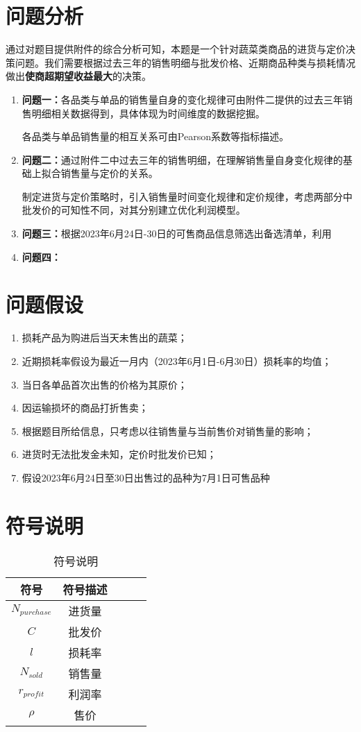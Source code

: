 \documentclass[withoutpreface,bwprint]{cumcmthesis} %
\begin{document}
\section{问题分析}
通过对题目提供附件的综合分析可知，本题是一个针对蔬菜类商品的进货与定价决策问题。我们需要根据过去三年的销售明细与批发价格、近期商品种类与损耗情况做出\textbf{使商超期望收益最大}的决策。

\begin{enumerate}
    \item \textbf{问题一：}各品类与单品的销售量自身的变化规律可由附件二提供的过去三年销售明细相关数据得到，具体体现为时间维度的数据挖掘。
    
    各品类与单品销售量的相互关系可由Pearson系数等指标描述。
    \item \textbf{问题二：}通过附件二中过去三年的销售明细，在理解销售量自身变化规律的基础上拟合销售量与定价的关系。
    
    制定进货与定价策略时，引入销售量时间变化规律和定价规律，考虑两部分中批发价的可知性不同，对其分别建立优化利润模型。
    \item \textbf{问题三：}根据2023年6月24日-30日的可售商品信息筛选出备选清单，利用
    \item \textbf{问题四：}
\end{enumerate}


\section{问题假设}
\begin{enumerate}
    \item 损耗产品为购进后当天未售出的蔬菜；
    \item 近期损耗率假设为最近一月内（2023年6月1日-6月30日）损耗率的均值；
    \item 当日各单品首次出售的价格为其原价；
    \item 因运输损坏的商品打折售卖；
    \item 根据题目所给信息，只考虑以往销售量与当前售价对销售量的影响；
    \item 进货时无法批发金未知，定价时批发价已知；
    \item 假设2023年6月24日至30日出售过的品种为7月1日可售品种
\end{enumerate}

\section{符号说明}
\begin{table}[!htbp]
    \caption{符号说明}\label{tab:001} \centering
    \begin{tabular}{ccccc}
        \toprule[1.5pt]
        符号 & 符号描述\\
        \midrule[1pt]
        $N_{purchase}$ & 进货量 \\
        $C$ & 批发价 \\
        $l$ & 损耗率 \\
        $N_{sold}$ & 销售量 \\
        $r_{profit}$ & 利润率 \\
        $\rho$ & 售价 \\
        \bottomrule[1.5pt]
    \end{tabular}
\end{table}
\end{document}

